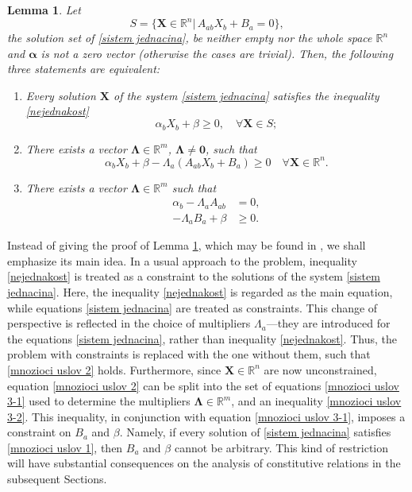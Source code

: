 \documentclass[a4paper,fleqn]{cas-sc}
\newtheorem{lemma}{Lemma}[section]
\theoremstyle{definition}
\begin{document}
\begin{lemma} \label{lemma:Liu-Lemma}
	Let 
	\begin{equation*}
		S=\{\mathbf{X}\in\mathbb{R}^n|\,A_{ab}X_b+B_a=0\},
	\end{equation*}
	the solution set of \eqref{sistem jednacina}, be neither empty nor the whole space $\mathbb{R}^n$ and $\boldsymbol{\alpha}$ is not a zero vector (otherwise the cases are trivial). Then, the following three statements are equivalent: 
	\begin{enumerate}
		\item[1)] Every solution $\mathbf{X}$ of the system \eqref{sistem jednacina} satisfies the inequality \eqref{nejednakost} 
		\begin{equation} \label{mnozioci uslov 1}
			\alpha_bX_b+\beta\geq 0,\quad \forall\mathbf{X}\in S;
		\end{equation}
		\item[2)]
		There exists a vector $\boldsymbol\Lambda\in\mathbb{R}^m$, $\boldsymbol{\Lambda} \neq \mathbf{0}$, such that 
		\begin{equation} \label{mnozioci uslov 2}
			\alpha_bX_b+\beta-\Lambda_a(A_{ab}X_b+B_a)\geq 0 \quad 	
			\forall\mathbf{X}\in\mathbb{R}^n.
		\end{equation}
		\item[3)]
		There exists a vector $\boldsymbol\Lambda\in\mathbb{R}^m$ such that
		\begin{align} 
			\alpha_b-\Lambda_aA_{ab}&=0,
			\label{mnozioci uslov 3-1} \\
			-\Lambda_aB_a+\beta&\geq 0. 
			\label{mnozioci uslov 3-2}
		\end{align}
	\end{enumerate}
\end{lemma}

Instead of giving the proof of Lemma \ref{lemma:Liu-Lemma}, which may be found in \cite{liu1972method,liu2002continuum}, we shall emphasize its main idea. In a usual approach to the problem, inequality \eqref{nejednakost} is treated as a constraint to the solutions of the system \eqref{sistem jednacina}. Here, the inequality \eqref{nejednakost} is regarded as the main equation, while equations \eqref{sistem jednacina} are treated as constraints. This change of perspective is reflected in the choice of multipliers $\Lambda_a$---they are introduced for the equations \eqref{sistem jednacina}, rather than inequality \eqref{nejednakost}. Thus, the problem with constraints is replaced with the one without them, such that \eqref{mnozioci uslov 2} holds. Furthermore, since $\mathbf{X} \in \mathbb{R}^{n}$ are now unconstrained, equation \eqref{mnozioci uslov 2} can be split into the set of equations \eqref{mnozioci uslov 3-1} used to determine the multipliers $\boldsymbol{\Lambda} \in \mathbb{R}^{m}$, and an inequality \eqref{mnozioci uslov 3-2}. This inequality, in conjunction with equation \eqref{mnozioci uslov 3-1}, imposes a constraint on $B_{a}$ and $\beta$. Namely, if every solution of \eqref{sistem jednacina} satisfies \eqref{mnozioci uslov 1}, then $B_{a}$ and $\beta$ cannot be arbitrary. This kind of restriction will have substantial consequences on the analysis of constitutive relations in the subsequent Sections. 
\end{document}
